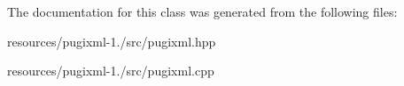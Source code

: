 The documentation for this class was generated from the following files\+:\begin{DoxyCompactItemize}
\item 
resources/pugixml-\/1./src/pugixml.\+hpp\item 
resources/pugixml-\/1./src/pugixml.\+cpp\end{DoxyCompactItemize}
